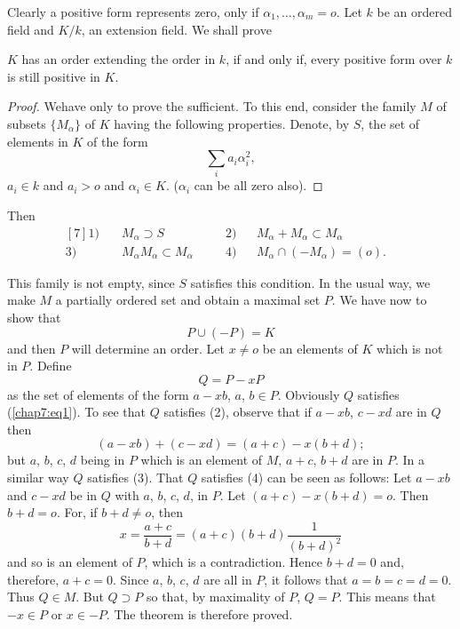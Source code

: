 Clearly a positive form represents zero, only if $\alpha_1 , \ldots ,
\alpha_m =o$. Let $k$ be an ordered field and $K/k$, an extension
field. We shall prove 

\setcounter{thm}{0}
\begin{thm}\label{c7:thm1} %
 $K$ has an order extending the order in $k$, if and only if, every
    positive form over  $k$ is still positive in $K$. 
\end{thm}

\begin{proof} %
We\pageoriginale have only to prove the sufficient. To this end,
consider the family $M$ of subsets $\{ M_\alpha \}$ of $K$ having the
following properties. Denote, by  $S$, the set of elements in $K$ of
the form  
$$
\sum_{i} a_i \alpha^2_i,
$$
$a_i \in k$ and $a_i >o$ and $\alpha_i \in K$. ($\alpha_i$ can be
all zero also). 
\end{proof}

Then 
$$
\begin{aligned}[7]
 1) \quad & M_\alpha \supset S &  & \quad  2) & &  M_\alpha
 +M_\alpha \subset   M_\alpha&  \\  
 3) \quad & M_\alpha M_\alpha \subset M_\alpha & & \quad  4)
 &&M_\alpha \cap (-  M_\alpha )= (o).& 
\end{aligned}
$$

This family is not empty, since $S$ satisfies this condition. In the
usual way,  we make $M$ a partially ordered  set and obtain a maximal
set $P$. We have now to show that  
$$
P \cup(-P)=K
$$
and then $P$ will determine an order. Let $x \neq o$ be an elements of
$K$ which is not in $P$. Define 
$$
Q= P- xP
$$
as the set of elements of the form $a-x  b$, $a$, $b \in  P$. Obviously
$Q$ satisfies (\ref{chap7:eq1}). To see that $Q$ satisfies (2),
observe that  if 
$a-x b$, $c-x d$ are in $Q$ then  
$$
(a-xb)+(c-xd)=(a+c) - x(b+d);
$$
but $a$, $b$, $c$, $d$ being in $P$ which is an element of $M$, $a+c$, $b+d$
are in $P$. In a similar way $Q$ satisfies (3). That $Q$ satisfies
(4) can be seen as follows: Let $a-xb$ and $c-xd$ be in $Q$ with
$a$, $b$, $c$, $d$, in  $P$. Let $(a+c)-x(b+d) =o$. Then $b+d=o$. For,
if $b+d \neq o$, then  
$$
x= \frac{a+c}{b+d} = (a+c) (b+d) \frac{1}{(b+d)^2}
$$\pageoriginale
and so is an element of $P$, which is a contradiction. Hence $b+d=0$
and, therefore, $a+c=0$. Since $a$, $b$, $c$, $d$ are all in $P$, it
follows that $a=b=c=d=0$. Thus $Q \in M$. But $Q \supset P$ so that,
by maximality of $P$, $Q=P$. This means that $-x\in P$ or $x \in
-P$. The theorem is therefore proved.

